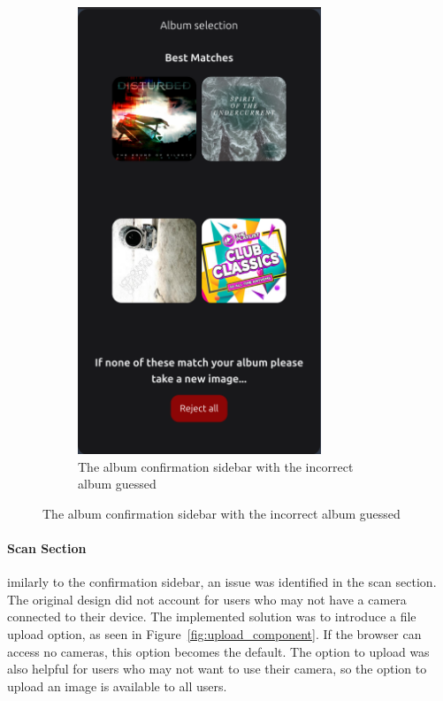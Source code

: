 \begin{figure}[H]
\begin{subfigure}[t]{0.3\textwidth}
        \includegraphics[width=0.8\textwidth]{figures/top_results_confirm.png}
        \caption{The album confirmation sidebar with the incorrect album guessed}
        \label{fig:album_confirmation_sidebar_incorrect}
    \end{subfigure}
\end{figure}

\paragraph{Scan Section}
imilarly to the confirmation sidebar, an issue was identified in the scan section. The original design did not account for users who may not have a camera connected to their device. The implemented solution was to introduce a file upload option, as seen in Figure~\ref{fig:upload_component}. If the browser can access no cameras, this option becomes the default. The option to upload was also helpful for users who may not want to use their camera, so the option to upload an image is available to all users.

